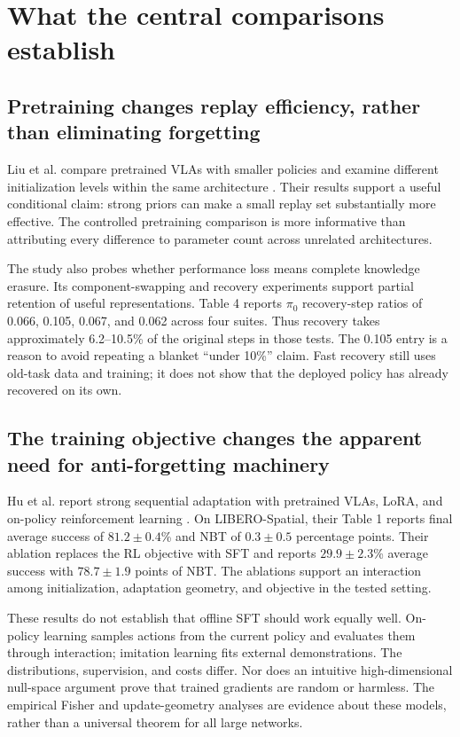 \documentclass[11pt,a4paper]{article}
\begin{document}
\section{What the central comparisons establish}
\subsection{Pretraining changes replay efficiency, rather than eliminating forgetting}
Liu et al. compare pretrained VLAs with smaller policies and examine different initialization levels within the same architecture \cite{liu_er}. Their results support a useful conditional claim: strong priors can make a small replay set substantially more effective. The controlled pretraining comparison is more informative than attributing every difference to parameter count across unrelated architectures.

The study also probes whether performance loss means complete knowledge erasure. Its component-swapping and recovery experiments support partial retention of useful representations. Table 4 reports $\pi_0$ recovery-step ratios of 0.066, 0.105, 0.067, and 0.062 across four suites. Thus recovery takes approximately 6.2--10.5\% of the original steps in those tests. The 0.105 entry is a reason to avoid repeating a blanket ``under 10\%'' claim. Fast recovery still uses old-task data and training; it does not show that the deployed policy has already recovered on its own.

\subsection{The training objective changes the apparent need for anti-forgetting machinery}
Hu et al. report strong sequential adaptation with pretrained VLAs, LoRA, and on-policy reinforcement learning \cite{hu_rl}. On LIBERO-Spatial, their Table 1 reports final average success of $81.2\pm0.4$\% and NBT of $0.3\pm0.5$ percentage points. Their ablation replaces the RL objective with SFT and reports $29.9\pm2.3$\% average success with $78.7\pm1.9$ points of NBT. The ablations support an interaction among initialization, adaptation geometry, and objective in the tested setting.

These results do not establish that offline SFT should work equally well. On-policy learning samples actions from the current policy and evaluates them through interaction; imitation learning fits external demonstrations. The distributions, supervision, and costs differ. Nor does an intuitive high-dimensional null-space argument prove that trained gradients are random or harmless. The empirical Fisher and update-geometry analyses are evidence about these models, rather than a universal theorem for all large networks.
\end{document}

